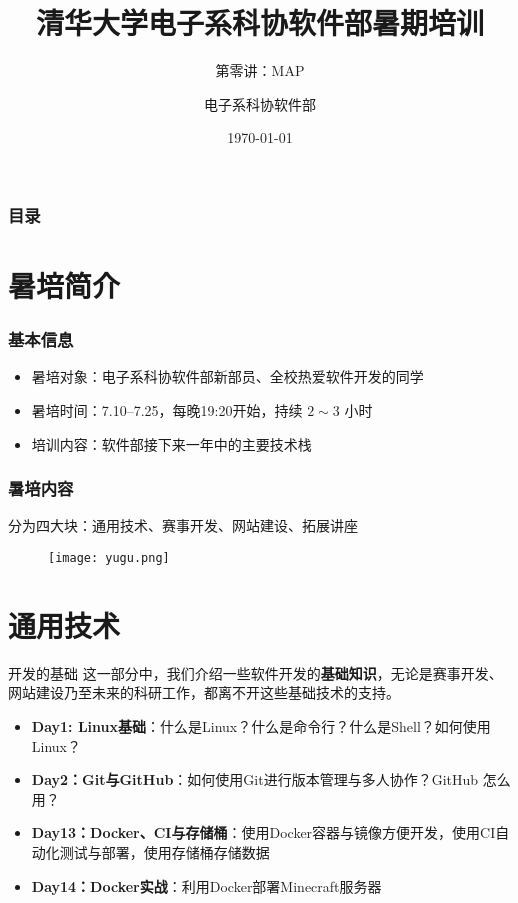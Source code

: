 \documentclass{beamer}
\title{清华大学电子系科协软件部暑期培训}
\subtitle{第零讲：MAP}
\author{电子系科协软件部}
\date{\today}
\begin{document}
	\titlepage
	
	\begin{frame}
        \frametitle{目录}
        \tableofcontents
    \end{frame}

    \section{暑培简介}

    \begin{frame}
        \frametitle{基本信息}
        \begin{itemize}
            \item 暑培对象：电子系科协软件部新部员、全校热爱软件开发的同学
            \item 暑培时间：7.10--7.25，每晚19:20开始，持续 $2\sim3$ 小时
            \item 培训内容：软件部接下来一年中的主要技术栈
        \end{itemize}
    \end{frame}

    \begin{frame}
        \frametitle{暑培内容}
        分为四大块：通用技术、赛事开发、网站建设、拓展讲座
        \begin{figure}[H]
            \centering
            \texttt{[image: yugu.png]}
        \end{figure}
    \end{frame}

    \section{通用技术}

    \begin{frame}{开发的基础}
        这一部分中，我们介绍一些软件开发的\textbf{基础知识}，无论是赛事开发、网站建设乃至未来的科研工作，都离不开这些基础技术的支持。
        \begin{itemize}
            \item \textbf{Day1: Linux基础}：什么是Linux？什么是命令行？什么是Shell？如何使用Linux？
            \item \textbf{Day2：Git与GitHub}：如何使用Git进行版本管理与多人协作？GitHub 怎么用？
            \item \textbf{Day13：Docker、CI与存储桶}：使用Docker容器与镜像方便开发，使用CI自动化测试与部署，使用存储桶存储数据
            \item \textbf{Day14：Docker实战}：利用Docker部署Minecraft服务器
        \end{itemize}
    \end{frame}
\end{document}
